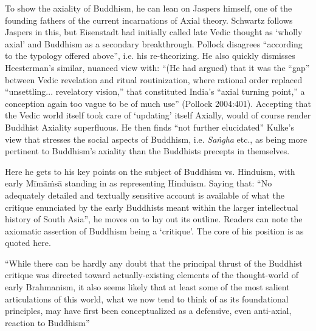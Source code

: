To show the axiality of Buddhism, he can lean on Jaspers himself, one of the founding fathers of the current incarnations of Axial theory. Schwartz follows Jaspers in this, but Eisenstadt had initially called late Vedic thought as ‘wholly axial’ and Buddhism as a secondary breakthrough. Pollock disagrees “according to the typology offered above”, i.e. his re-theorizing. He also quickly dismisses Heesterman’s similar, nuanced view with: “(He had argued) that it was the “gap” between Vedic revelation and ritual routinization, where rational order replaced “unsettling... revelatory vision,” that constituted India’s “axial turning point,” a conception again too vague to be of much use” (Pollock 2004:401). Accepting that the Vedic world itself took care of ‘updating’ itself Axially, would of course render Buddhist Axiality superfluous. He then finds “not further elucidated” Kulke’s view that stresses the social aspects of Buddhism, i.e. \textit{Saṅgha} etc., as being more pertinent to Buddhism’s axiality than the Buddhists precepts in themselves.

\vspace{.1cm}

Here he gets to his key points on the subject of Buddhism vs. Hinduism, with early Mīmāṁsā standing in as representing Hinduism. Saying that: “No adequately detailed and textually sensitive account is available of what the critique enunciated by the early Buddhists meant within the larger intellectual history of South Asia”, he moves on to lay out its outline. Readers can note the axiomatic assertion of Buddhism being a ‘critique’. The core of his position is as quoted here.

\vspace{.1cm}

\begin{myquote}
“While there can be hardly any doubt that the principal thrust of the Buddhist critique was directed toward actually-existing elements of the thought-world of early Brahmanism, it also seems likely that at least some of the most salient articulations of this world, what we now tend to think of as its foundational principles, may have first been conceptualized as a defensive, even anti-axial, reaction to Buddhism”
\end{myquote}

\vspace{.1cm}


